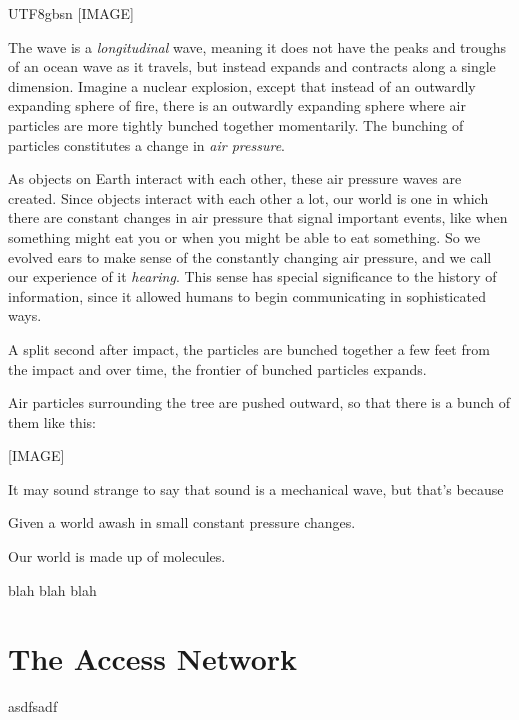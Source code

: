 \documentclass[UTF8]{book}
\begin{document}
\begin{CJK}{UTF8}{gbsn}
[IMAGE]

The wave is a \emph{longitudinal} wave, meaning it does not have the peaks and troughs of an ocean wave as it travels, but instead expands and contracts along a single dimension. Imagine a nuclear explosion, except that instead of an outwardly expanding sphere of fire, there is an outwardly expanding sphere where air particles are more tightly bunched together momentarily. The bunching of particles constitutes a change in \emph{air pressure}.

As objects on Earth interact with each other, these air pressure waves are created. Since objects interact with each other a lot, our world is one in which there are constant changes in air pressure that signal important events, like when something might eat you or when you might be able to eat something. So we evolved ears to make sense of the constantly changing air pressure, and we call our experience of it \emph{hearing}. This sense has special significance to the history of information, since it allowed humans to begin communicating in sophisticated ways.








A split second after impact, the particles are bunched together a few feet from the impact and over time, the frontier of bunched particles expands.



Air particles surrounding the tree are pushed outward, so that there is a bunch of them like this:

[IMAGE]





It may sound strange to say that sound is a mechanical wave, but that's because

Given a world awash in small constant pressure changes.

Our world is made up of molecules.



blah blah blah

\chapter{The Access Network}

asdfsadf

\end{CJK}
\end{document}
